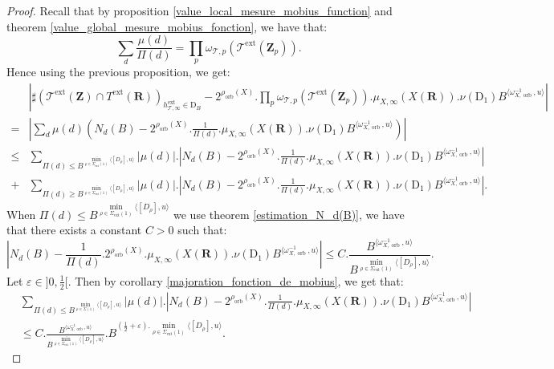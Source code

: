 \documentclass{proc-l}
\newcommand{\R}{\mathbf{R}}
\newcommand{\Z}{\mathbf{Z}}
\DeclareMathOperator{\orb}{orb}
\DeclareMathOperator{\ext}{ext}
\newcommand{\stackT}{\mathcal{T}}
\newcommand{\w}{\omega}
\theoremstyle{definition}
\theoremstyle{remark}
\numberwithin{equation}{section}
\begin{document}
\begin{proof}
    Recall that by proposition \ref{value_local_mesure_mobius_function} and theorem \ref{value_global_mesure_mobius_fonction}, we have that:
    $$\sum\limits_d \frac{\mu(d)}{\Pi(d)} = \prod\limits_p \w_{\stackT,p}(\stackT^{\ext}(\Z_p)) .$$ Hence using the previous proposition, we get:
    \begin{align*}
        &\left| \sharp( \stackT^{\ext}(\Z) \cap T^{\ext}(\R) )_{h^{\ext}_{\stackT,\infty} \in \mathrm{D}_B} - 2^{\rho_{\orb}(X)}. \prod\limits_p \w_{\stackT,p}(\stackT^{\ext}(\Z_p)) . \mu_{X,\infty}(X(\R)). \nu(\mathrm{D}_1) B^{ \langle \w_{X,\orb}^{-1} , u \rangle } \right| \\
        =& \left| \sum\limits_d \mu(d) \left( N_d(B) - 2^{\rho_{\orb}(X)} . \frac{1}{\Pi(d)} . \mu_{X,\infty}(X(\R)). \nu(\mathrm{D}_1) B^{ \langle \w_{X,\orb}^{-1} , u \rangle } \right) \right| \\
        \leqslant&  \sum\limits_{\Pi(d) \leqslant B^{\min\limits_{\rho \in \Sigma_{\ext}(1)} \langle [D_{\rho}] , u \rangle }} | \mu(d) | . \left| N_d(B) - 2^{\rho_{\orb}(X)} . \frac{1}{\Pi(d)} . \mu_{X,\infty}(X(\R)). \nu(\mathrm{D}_1) B^{ \langle \w_{X,\orb}^{-1} , u \rangle } \right| \\
        +& \sum\limits_{\Pi(d) \geqslant B^{\min\limits_{\rho \in \Sigma_{\ext}(1)} \langle [D_{\rho}] , u \rangle }} | \mu(d) | . \left| N_d(B) - 2^{\rho_{\orb}(X)} . \frac{1}{\Pi(d)} . \mu_{X,\infty}(X(\R)). \nu(\mathrm{D}_1) B^{ \langle \w_{X,\orb}^{-1} , u \rangle } \right|.
    \end{align*}
    When $\Pi(d) \leqslant B^{\min\limits_{\rho \in \Sigma_{\ext}(1)} \langle [D_{\rho}] , u \rangle }$ we use theorem \ref{estimation_N_d(B)}, we have that there exists a constant $C > 0$ such that:
    $$\left|  N_d(B) - \frac{1}{\Pi(d)}.2^{\rho_{\orb}(X)}.\mu_{X,\infty}(X(\R)). \nu(\mathrm{D}_1) B^{ \langle \w_{X,\orb}^{-1} , u \rangle } \right| \leqslant C .\frac{B^{\langle \w_{X,\orb}^{-1},u\rangle}}{B^{ \min\limits_{\rho \in \Sigma_{\ext}(1)} \langle [D_{\rho}],u\rangle } } .$$Let $\varepsilon \in ]0,\frac{1}{2}[$. Then by corollary \ref{majoration_fonction_de_mobius}, we get that:
    \begin{align*}
        &\sum\limits_{\Pi(d) \leqslant B^{\min\limits_{\rho \in \Sigma(1)} \langle [D_{\rho}] , u \rangle }} | \mu(d) | . \left| N_d(B) - 2^{\rho_{\orb}(X)} . \frac{1}{\Pi(d)} . \mu_{X,\infty}(X(\R)). \nu(\mathrm{D}_1) B^{ \langle \w_{X,\orb}^{-1} , u \rangle } \right| \\
         &\leqslant C.\frac{B^{\langle \w_{X,\orb}^{-1},u\rangle}}{B^{ \min\limits_{\rho \in \Sigma_{\ext}(1)} \langle [D_{\rho}],u\rangle } } . B^{(\frac{1}{2} + \varepsilon).\min\limits_{\rho \in \Sigma_{\ext}(1)} \langle [D_{\rho}],u\rangle }.

\end{align*}
\end{proof}
\end{document}
